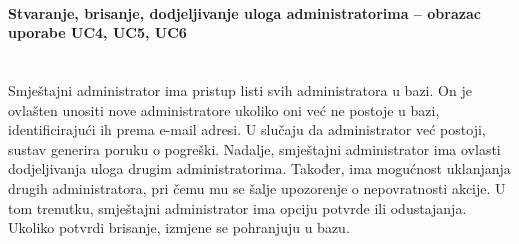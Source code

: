 				\paragraph{Stvaranje, brisanje, dodjeljivanje uloga administratorima – obrazac uporabe UC4, UC5, UC6}\mbox{} \\
				Smještajni administrator ima pristup listi svih administratora u bazi. On je ovlašten unositi nove administratore ukoliko oni već ne postoje u bazi, identificirajući ih prema e-mail adresi. U slučaju da administrator već postoji, sustav generira poruku o pogreški. Nadalje, smještajni administrator ima ovlasti dodjeljivanja uloga drugim administratorima. Također, ima mogućnost uklanjanja drugih administratora, pri čemu mu se šalje upozorenje o nepovratnosti akcije. U tom trenutku, smještajni administrator ima opciju potvrde ili odustajanja. Ukoliko potvrdi brisanje, izmjene se pohranjuju u bazu. 
				
